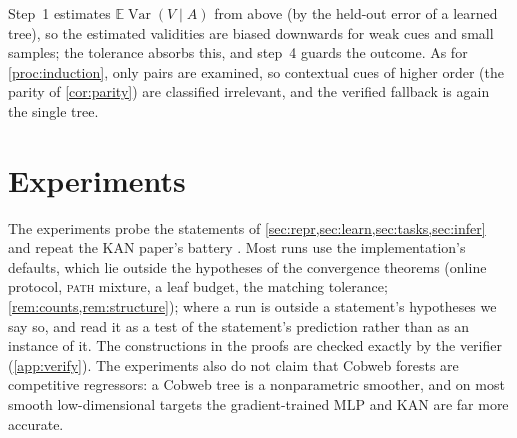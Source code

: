 \documentclass[11pt]{article}
\theoremstyle{definition}
\theoremstyle{remark}
\newcommand{\E}{\mathbb{E}}
\newcommand{\Var}{\operatorname{Var}}
\begin{document}
Step~1 estimates $\E\Var(V\mid A)$ from above (by the held-out error of a learned tree), so
the estimated validities are biased downwards for weak cues and small samples; the
tolerance absorbs this, and step~4 guards the outcome.  As for \cref{proc:induction}, only
pairs are examined, so contextual cues of higher order (the parity of \cref{cor:parity})
are classified irrelevant, and the verified fallback is again the single tree.

\section{Experiments}\label{sec:experiments}

The experiments probe the statements of \cref{sec:repr,sec:learn,sec:tasks,sec:infer}
and repeat the KAN paper's battery \citep{liu2024kan}.  Most runs use the
implementation's defaults, which lie outside the hypotheses of the convergence
theorems (online protocol, \textsc{path} mixture, a leaf budget, the matching tolerance;
\cref{rem:counts,rem:structure}); where a run is outside a statement's hypotheses we say
so, and read it as a test of the statement's prediction rather than as an instance of it.
The constructions in the proofs are checked exactly by the verifier (\cref{app:verify}).
The experiments also do not claim that Cobweb forests are competitive regressors: a
Cobweb tree is a nonparametric smoother, and on most smooth low-dimensional targets the
gradient-trained MLP and KAN are far more accurate.
\end{document}
